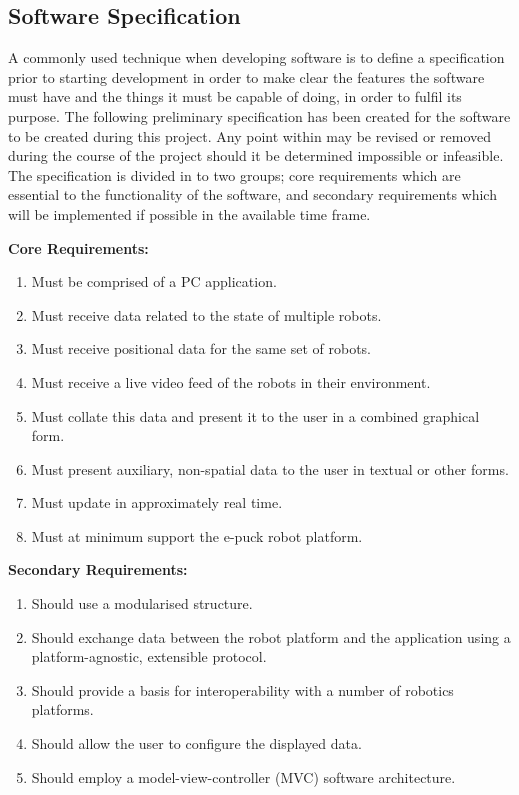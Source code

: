 \documentclass[titlepage,hidelinks,10pt]{article}
\begin{document}
\subsection{Software Specification}
A commonly used technique when developing software is to define a specification prior to starting development in order to make clear the features the software must have and the things it must be capable of doing, in order to fulfil its purpose\cite{NASAApproach}. The following preliminary specification has been created for the software to be created during this project. Any point within may be revised or removed during the course of the project should it be determined impossible or infeasible. The specification is divided in to two groups; core requirements which are essential to the functionality of the software, and secondary requirements which will be implemented if possible in the available time frame.

\noindent \textbf{Core Requirements:}
\begin{enumerate}
	\item Must be comprised of a PC application.
	\item Must receive data related to the state of multiple robots.
	\item Must receive positional data for the same set of robots.
	\item Must receive a live video feed of the robots in their environment.
	\item Must collate this data and present it to the user in a combined graphical form.
	\item Must present auxiliary, non-spatial data to the user in textual or other forms.
	\item Must update in approximately real time.
	\item Must at minimum support the e-puck robot platform.
\end{enumerate}

\noindent \textbf{Secondary Requirements:}
\begin{enumerate}
	\item Should use a modularised structure.
	\item Should exchange data between the robot platform and the application using a platform-agnostic, extensible protocol.
	\item Should provide a basis for interoperability with a number of robotics platforms.
	\item Should allow the user to configure the displayed data.
	\item Should employ a model-view-controller (MVC) software architecture.
\end{enumerate}
\end{document}
